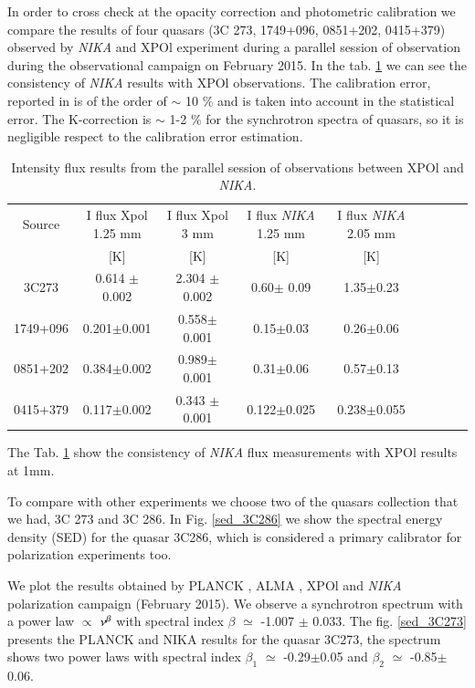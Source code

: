 \documentclass[twocolumn,traditabstract]{aa}
\begin{document}
In order to cross check at the opacity correction and photometric calibration we
compare the results of four quasars (3C 273, 1749+096, 0851+202, 0415+379)
observed by {\it NIKA} and XPOl experiment \citep{thum2008} during a parallel
session of observation during the observational campaign on February 2015. In
the tab. \ref{tab:calib} we can see the consistency of {\it NIKA} results with
XPOl observations. The calibration error, reported in \citep{catalano2014} is of
the order of $\sim$ 10 $\%$ and is taken into account in the statistical
error. The K-correction is $\sim$ 1-2 $\%$ for the synchrotron spectra of
quasars, so it is negligible respect to the calibration error estimation.

\begin{table}
\begin{center}
\begin{tabular}{ccccccccc}
\hline
\hline
Source & I flux Xpol 1.25 mm & I flux Xpol 3 mm &  I flux {\it NIKA}  1.25 mm& I flux {\it NIKA}  2.05 mm\\
 & [K] & [K] & [K] & [K]\\
\hline
3C273 & 0.614 $\pm$0.002      &  2.304 $\pm$ 0.002  & 0.60$\pm$ 0.09    &  1.35$\pm$0.23\\
1749+096 & 0.201$\pm$0.001 & 0.558$\pm$0.001     & 0.15$\pm$0.03     &  0.26$\pm$0.06\\
0851+202 & 0.384$\pm$0.002 & 0.989$\pm$0.001     & 0.31$\pm$0.06     &  0.57$\pm$0.13 \\
0415+379 & 0.117$\pm$0.002 &  0.343 $\pm$0.001   & 0.122$\pm$0.025 &  0.238$\pm$0.055\\
\hline
\end{tabular}
\end{center}
\caption{Intensity flux results from the parallel session of observations between XPOl and {\it NIKA}.}
\label{tab:calib}
\end{table}

The Tab. \ref{tab:calib} show the consistency of {\it NIKA} flux measurements with XPOl results at 1mm.

To compare with other experiments we choose two of the quasars collection that we had, 3C 273 and 3C 286. In Fig. \ref{sed_3C286} we show the spectral energy density (SED) for the quasar 3C286, which is considered a primary calibrator for polarization experiments too. 

We plot the results obtained by PLANCK \citep{planckcatalogue}, ALMA \citep{almacalib}, XPOl \citep{xpol} and {\it NIKA} polarization campaign (February 2015).  We observe a synchrotron spectrum with a power law $\propto$ $\nu^{\rm \beta}$ with spectral index  $\beta$ $\simeq$ -1.007 $\pm$ 0.033. The fig. \ref{sed_3C273} presents the PLANCK and NIKA results for the quasar 3C273, the spectrum shows two power laws with spectral index $\beta_1$ $\simeq$ -0.29$\pm$0.05 and $\beta_2$ $\simeq$ -0.85$\pm$0.06. 
\end{document}
